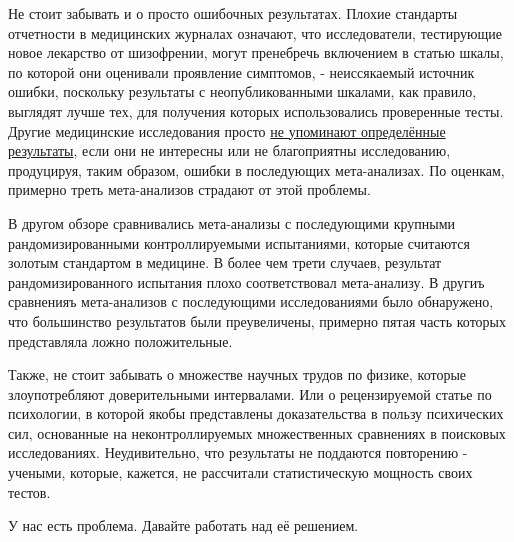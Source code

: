 Не стоит забывать и о просто ошибочных результатах. Плохие стандарты отчетности в медицинских журналах означают, что исследователи, тестирующие новое лекарство от шизофрении, могут пренебречь включением в статью шкалы, по которой они оценивали проявление симптомов, - неиссякаемый источник ошибки, поскольку результаты с неопубликованными шкалами, как правило, выглядят лучше тех, для получения которых использовались проверенные тесты.\cite{marshall_unpublished_2000} Другие медицинские исследования просто \hyperref[chp10:leaveoutdetails]{не упоминают определённые результаты}, если они не интересны или не благоприятны исследованию, продуцируя, таким образом, ошибки в последующих мета-анализах. По оценкам, примерно треть мета-анализов страдают от этой проблемы.\cite{kirkham_impact_2010}

В другом обзоре сравнивались мета-анализы с последующими крупными рандомизированными контроллируемыми испытаниями, которые считаются золотым стандартом в медицине. В более чем трети случаев, результат рандомизированного испытания плохо соответствовал мета-анализу.\cite{lelorier_discrepancies_1997} В другиъ сравненияъ мета-анализов с последующими исследованиями было обнаружено, что большинство результатов были преувеличены, примерно пятая часть которых представляла ложно положительные.\cite{pereira_statistically_2011}

Также, не стоит забывать о множестве научных трудов по физике, которые злоупотребляют доверительными интервалами.\cite{lanzante_cautionary_2005} Или о рецензируемой статье по психологии, в которой якобы представлены доказательства в пользу психических сил, основанные на неконтроллируемых множественных сравнениях в поисковых исследованиях.\cite{wagenmakers_why_2011} Неудивительно, что результаты не поддаются повторению - учеными, которые, кажется, не рассчитали статистическую мощность своих тестов.\cite{galak_correcting_2012}

У нас есть проблема. Давайте работать над её решением.
